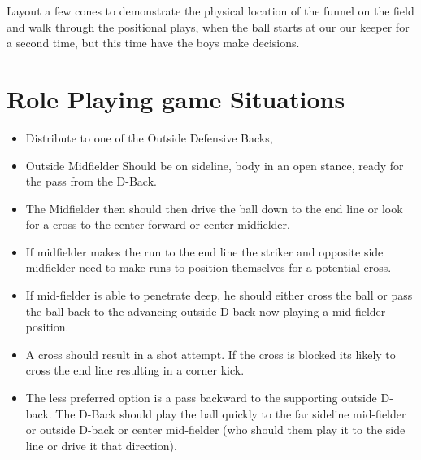 \documentclass[10pt,letterpaper]{article}
\newenvironment{evenBlock}[1]{%
    \tcolorbox[beamer,%
    noparskip,breakable,
    colback=LightGreen,colframe=DarkGreen,%
    colbacklower=LimeGreen!75!LightGreen,%
    title=#1]}%
    {\endtcolorbox}
\newenvironment{oddBlock}[1]{%
    \tcolorbox[beamer,%
    noparskip,breakable,
    colback=LightBlue,colframe=DarkBlue,%
    colbacklower=DarkBlue!75!LightBlue,%
    title=#1]}%
    {\endtcolorbox}
\begin{document}
\begin{evenBlock}{Funnel Positioning}
    Layout a few cones to demonstrate the physical location of the funnel on the field and walk through the positional plays, when the ball starts at our our keeper for a second time, but this time have the boys make decisions.
\end{evenBlock}

\section{Role Playing game Situations}

\begin{oddBlock}{Keeper Distribution}
    \begin{itemize}
        \item Distribute to one of the Outside Defensive Backs,
        \item Outside Midfielder Should be on sideline, body in an open stance, ready for the pass from the D-Back.
        \item The Midfielder then should then drive the ball down to the end line or look for a cross to the center forward or center midfielder.
        \item If midfielder makes the run to the end line the striker and opposite side midfielder need to make runs to position themselves for a potential cross. 
        \item If mid-fielder is able to penetrate deep, he should either cross the ball or pass the ball back to the advancing outside D-back now playing a mid-fielder position.
        \item  A cross should result in a shot attempt.  If the cross is blocked its likely to cross the end line resulting in a corner kick.
        \item The less preferred option is a pass backward to the supporting outside D-back.  The D-Back should play the ball quickly to the far sideline mid-fielder or outside D-back or center mid-fielder (who should them play it to the side line or drive it that direction).
    \end{itemize}
\end{oddBlock}
\end{document}
